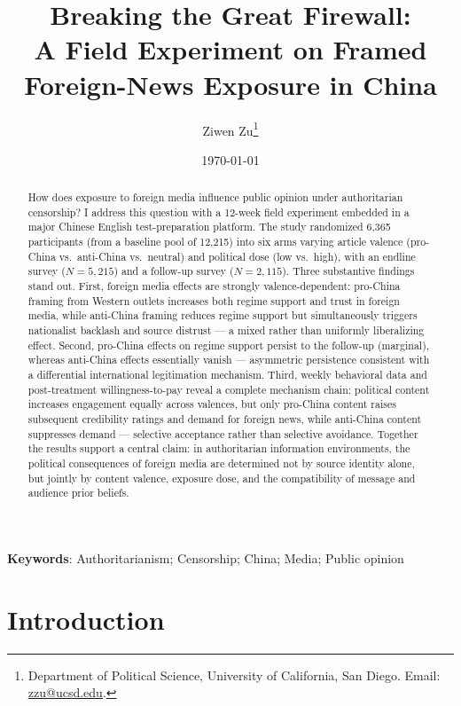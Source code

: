 \documentclass[12pt,american]{article}
\title{\textbf{Breaking the Great Firewall:}\\
\large A Field Experiment on Framed Foreign-News Exposure in China}
\author{Ziwen Zu\thanks{Department of Political Science, University of California, San Diego. Email: \href{mailto:zzu@ucsd.edu}{zzu@ucsd.edu}.}}
\date{\monthyear\today}
\begin{document}
\hypersetup{pageanchor=false}
\maketitle
\thispagestyle{empty}

\begin{abstract}
\noindent How does exposure to foreign media influence public opinion under authoritarian censorship? I address this question with a 12-week field experiment embedded in a major Chinese English test-preparation platform. The study randomized 6,365 participants (from a baseline pool of 12,215) into six arms varying article valence (pro-China vs.\ anti-China vs.\ neutral) and political dose (low vs.\ high), with an endline survey (\(N=5{,}215\)) and a follow-up survey (\(N=2{,}115\)). Three substantive findings stand out. First, foreign media effects are strongly valence-dependent: pro-China framing from Western outlets increases both regime support and trust in foreign media, while anti-China framing reduces regime support but simultaneously triggers nationalist backlash and source distrust — a mixed rather than uniformly liberalizing effect. Second, pro-China effects on regime support persist to the follow-up (marginal), whereas anti-China effects essentially vanish — asymmetric persistence consistent with a differential international legitimation mechanism. Third, weekly behavioral data and post-treatment willingness-to-pay reveal a complete mechanism chain: political content increases engagement equally across valences, but only pro-China content raises subsequent credibility ratings and demand for foreign news, while anti-China content suppresses demand — selective acceptance rather than selective avoidance. Together the results support a central claim: in authoritarian information environments, the political consequences of foreign media are determined not by source identity alone, but jointly by content valence, exposure dose, and the compatibility of message and audience prior beliefs.
\end{abstract}

\textbf{Keywords}: Authoritarianism; Censorship; China; Media; Public opinion

\newpage
\setcounter{page}{1}
\renewcommand{\thepage}{\arabic{page}}
\hypersetup{pageanchor=true}
\doublespacing

\section{Introduction}
\end{document}
